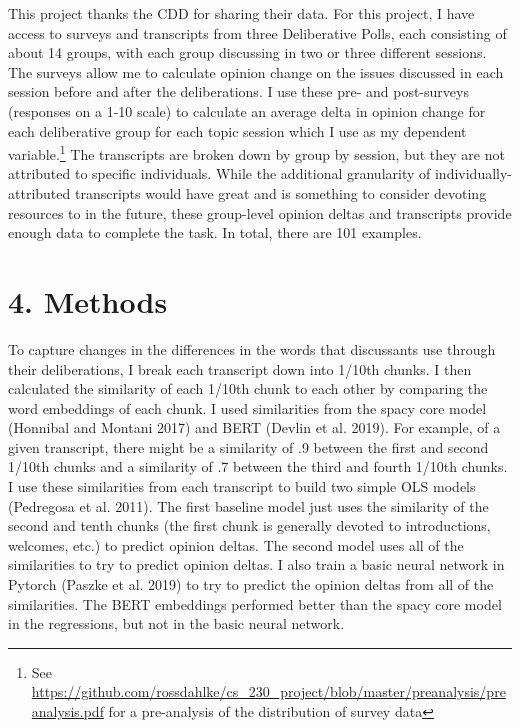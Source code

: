 \documentclass[12pt,]{article}
\begin{document}
This project thanks the CDD for sharing their data. For this project, I
have access to surveys and transcripts from three Deliberative Polls,
each consisting of about 14 groups, with each group discussing in two or
three different sessions. The surveys allow me to calculate opinion
change on the issues discussed in each session before and after the
deliberations. I use these pre- and post-surveys (responses on a 1-10
scale) to calculate an average delta in opinion change for each
deliberative group for each topic session which I use as my dependent
variable.\footnote{See
  \url{https://github.com/rossdahlke/cs_230_project/blob/master/preanalysis/preanalysis.pdf}
  for a pre-analysis of the distribution of survey data} The transcripts
are broken down by group by session, but they are not attributed to
specific individuals. While the additional granularity of
individually-attributed transcripts would have great and is something to
consider devoting resources to in the future, these group-level opinion
deltas and transcripts provide enough data to complete the task. In
total, there are 101 examples.

\hypertarget{methods}{%
\section{4. Methods}\label{methods}}

To capture changes in the differences in the words that discussants use
through their deliberations, I break each transcript down into 1/10th
chunks. I then calculated the similarity of each 1/10th chunk to each
other by comparing the word embeddings of each chunk. I used
similarities from the spacy core model (Honnibal and Montani 2017) and
BERT (Devlin et al. 2019). For example, of a given transcript, there
might be a similarity of .9 between the first and second 1/10th chunks
and a similarity of .7 between the third and fourth 1/10th chunks. I use
these similarities from each transcript to build two simple OLS models
(Pedregosa et al. 2011). The first baseline model just uses the
similarity of the second and tenth chunks (the first chunk is generally
devoted to introductions, welcomes, etc.) to predict opinion deltas. The
second model uses all of the similarities to try to predict opinion
deltas. I also train a basic neural network in Pytorch (Paszke et al.
2019) to try to predict the opinion deltas from all of the similarities.
The BERT embeddings performed better than the spacy core model in the
regressions, but not in the basic neural network.
\end{document}
